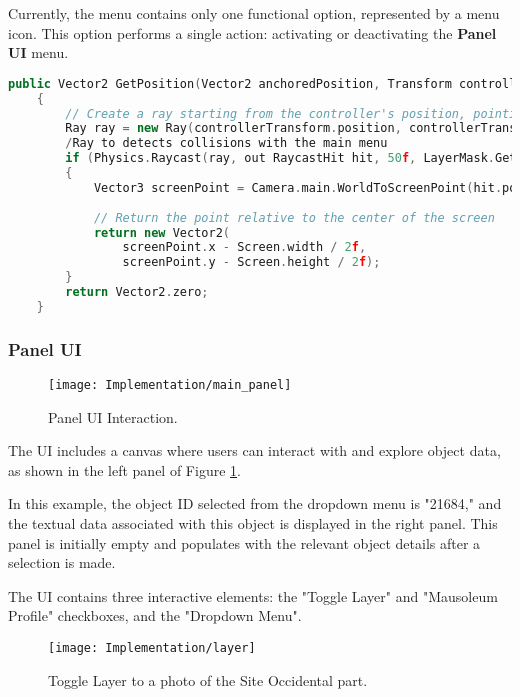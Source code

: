 Currently, the menu contains only one functional option, represented by a menu icon. This option performs a single action: activating or deactivating the \textbf{Panel \gls{UI}} menu.


\newpage

\begin{lstlisting}[language=C++, caption={Method used to acquire the position that was pointed at by the controller ray.}, label={lst:menu_raycast}]
    public Vector2 GetPosition(Vector2 anchoredPosition, Transform controllerTransform)
    {
        // Create a ray starting from the controller's position, pointing forward
        Ray ray = new Ray(controllerTransform.position, controllerTransform.forward);
        /Ray to detects collisions with the main menu
        if (Physics.Raycast(ray, out RaycastHit hit, 50f, LayerMask.GetMask("Default")))
        {
            Vector3 screenPoint = Camera.main.WorldToScreenPoint(hit.point);
            
            // Return the point relative to the center of the screen
            return new Vector2(
                screenPoint.x - Screen.width / 2f,
                screenPoint.y - Screen.height / 2f);
        }
        return Vector2.zero;
    }
\end{lstlisting}



\subsubsection{Panel \gls{UI}}
\label{sec:panel_UI}
\begin{figure}[h!]
    \centering
    \texttt{[image: Implementation/main\_panel]}
    \caption{Panel \gls{UI} Interaction.}
    \label{fig:main_panel}    
\end{figure}

The \gls{UI} includes a canvas where users can interact with and explore object data, as shown in the left panel of Figure \ref{fig:main_panel}. 

In this example, the object ID selected from the dropdown menu is "21684," and the textual data associated with this object is displayed in the right panel. 
This panel is initially empty and populates with the relevant object details after a selection is made. 

The \gls{UI} contains three interactive elements: the "Toggle Layer" and "Mausoleum Profile" checkboxes, and the "Dropdown Menu".

 \begin{figure}[h!]
    \centering
    \texttt{[image: Implementation/layer]}
    \caption{Toggle Layer to a photo of the Site Occidental part.}
    \label{fig:toggle_layer}    
\end{figure}


